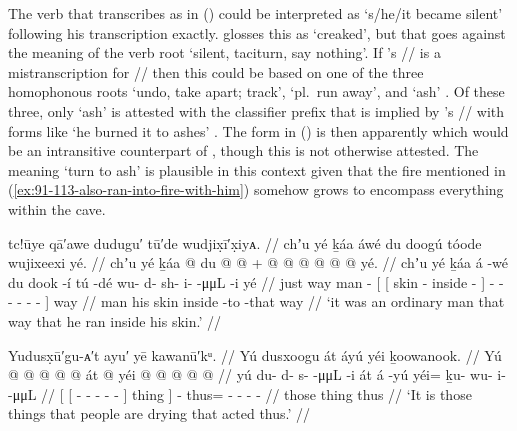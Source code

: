 The verb that \citeauthor{swanton:1909} transcribes as  in (\lastx) could be interpreted as  ‘s/he/it became silent’ following his transcription exactly.
\citeauthor{swanton:1909} glosses this as ‘creaked’, but that goes against the meaning of the verb root  ‘silent, taciturn, say nothing’.
If \citeauthor{swanton:1909}’s  // is a mistranscription for  // then this could be based on one of the three homophonous roots  ‘undo, take apart; track’,  ‘pl.\ run away’, and  ‘ash’ \parencite[61]{leer:1978b}.
Of these three, only  ‘ash’ is attested with the  classifier prefix that is implied by \citeauthor{swanton:1909}’s  // with forms like  ‘he burned it to ashes’ \parencite[38.366]{story-naish:1973}.
The form in (\lastx) is then apparently  which would be an intransitive counterpart of , though this is not otherwise attested.
The meaning ‘turn to ash’ is plausible in this context given that the fire mentioned in (\ref{ex:91-113-also-ran-into-fire-with-him}) somehow grows to encompass everything within the cave.

\ex\label{ex:91-117-man-run-into-skin}%
%
\begingl
	\glpreamble	tc!ūye qā′awe dudugu′ tū′de wudjix̣ī′x̣iyᴀ. //
	\glpreamble	chʼu yé ḵáa áwé du doogú tóode wujixeexi yé. //
	\gla	chʼu yé ḵáa  @ {}
		{} {} du  @ {}  @ {} {} +
			 @ {} @ {} @ {} @ {} @ {} @ {} {} yé. //
	\glb	chʼu yé ḵáa á -wé
		{} {} du dook -í tú -dé {}
			wu- d- sh- i-  -μμL -i {} yé //
	\glc	just way man  -
		{}[ {}[  skin - inside - {}]
			- - - -
				 - - {}] way //
	\gld	{} {} man  {}
		{} {} his skin {} inside -to {}
			 {} {} {} {} {} -that {} way //
	\glft	‘it was an ordinary man that way that he ran inside his skin.’
		//
\endgl
\xe



\ex\label{ex:91-118-things-ppl-dry-act-thus}%
%
\begingl
	\glpreamble	Yudusx̣ū′gu-ᴀ′t ayu′ yē kawanū′kᵘ. //
	\glpreamble	Yú dusxoogu át áyú yéi ḵoowanook. //
	\gla	{} Yú {}  @ {} @ {} @ {} @ {} @ {} {} át {}  @ {}
		yéi @  @ {} @ {} @ {} @ {} //
	\glb	{} yú {} du- d- s-  -μμL -i {} át {} á -yú
		yéi= ḵu- wu- i-  -μμL //
	\glc	{}[ 
			{}[ - - - 
				 - - {}] thing {}]
		 -
		thus= - - -  - //
	\gld	{} those {}  {} {} {} {} {} {}
			thing {}  {}
		thus  {} {} {} {} //
	\glft	‘It is those things that people are drying that acted thus.’
		//
\endgl
\xe

